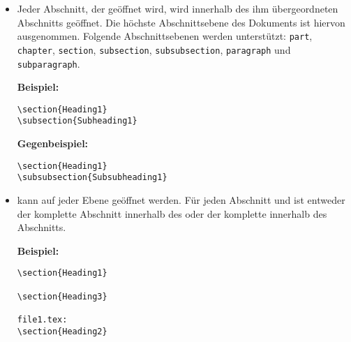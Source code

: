 \begin{itemize}
  \item Jeder Abschnitt, der geöffnet wird, wird innerhalb des ihm übergeordneten Abschnitts geöffnet.
  Die höchste Abschnittsebene des Dokuments ist hiervon ausgenommen.
  Folgende Abschnittsebenen werden unterstützt:
  \verb|part|, \verb|chapter|, \verb|section|, \verb|subsection|, \verb|subsubsection|, \verb|paragraph| und
  \verb|subparagraph|.

  \textbf{Beispiel:}
  \begin{verbatim}
\section{Heading1}
\subsection{Subheading1}
  \end{verbatim}

  \textbf{Gegenbeispiel:}
  \begin{verbatim}
\section{Heading1}
\subsubsection{Subsubheading1}
  \end{verbatim}

  \clearpage

  \item \verb|| kann auf jeder Ebene geöffnet werden.
  Für jeden Abschnitt und \verb|| ist entweder der komplette Abschnitt innerhalb des \verb|| oder der
  komplette \verb|| innerhalb des Abschnitts.

  \textbf{Beispiel:}
  \begin{verbatim}
\section{Heading1}

\section{Heading3}

file1.tex:
\section{Heading2}
  \end{verbatim}


\end{itemize}
